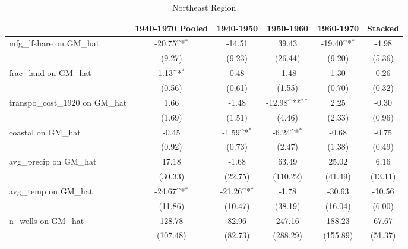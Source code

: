 \begin{table}[htbp]\centering
\def\sym#1{\ifmmode^{#1}\else\(^{#1}\)\fi}
\caption{Northeast Region}
\begin{tabular}{l*{5}{c}}
\toprule
                &\multicolumn{1}{c}{1940-1970 Pooled}&\multicolumn{1}{c}{1940-1950}&\multicolumn{1}{c}{1950-1960}&\multicolumn{1}{c}{1960-1970}&\multicolumn{1}{c}{Stacked}\\
\midrule
mfg\_lfshare on GM\_hat&   -20.75\sym{*}  &   -14.51         &    39.43         &   -19.40\sym{*}  &    -4.98         \\
                &   (9.27)         &   (9.23)         &  (26.44)         &   (9.20)         &   (5.36)         \\
\addlinespace
frac\_land on GM\_hat&     1.13\sym{*}  &     0.48         &    -1.48         &     1.30         &     0.26         \\
                &   (0.56)         &   (0.61)         &   (1.55)         &   (0.70)         &   (0.32)         \\
\addlinespace
transpo\_cost\_1920 on GM\_hat&     1.66         &    -1.48         &   -12.98\sym{**} &     2.25         &    -0.30         \\
                &   (1.69)         &   (1.51)         &   (4.46)         &   (2.33)         &   (0.96)         \\
\addlinespace
coastal on GM\_hat&    -0.45         &    -1.59\sym{*}  &    -6.24\sym{*}  &    -0.68         &    -0.75         \\
                &   (0.92)         &   (0.73)         &   (2.47)         &   (1.38)         &   (0.49)         \\
\addlinespace
avg\_precip on GM\_hat&    17.18         &    -1.68         &    63.49         &    25.02         &     6.16         \\
                &  (30.33)         &  (22.75)         & (110.22)         &  (41.49)         &  (13.11)         \\
\addlinespace
avg\_temp on GM\_hat&   -24.67\sym{*}  &   -21.26\sym{*}  &    -1.78         &   -30.63         &   -10.56         \\
                &  (11.86)         &  (10.47)         &  (38.19)         &  (16.04)         &   (6.00)         \\
\addlinespace
n\_wells on GM\_hat&   128.78         &    82.96         &   247.16         &   188.23         &    67.67         \\
                & (107.48)         &  (82.73)         & (288.29)         & (155.89)         &  (51.37)         \\

\end{tabular}
\end{table}
